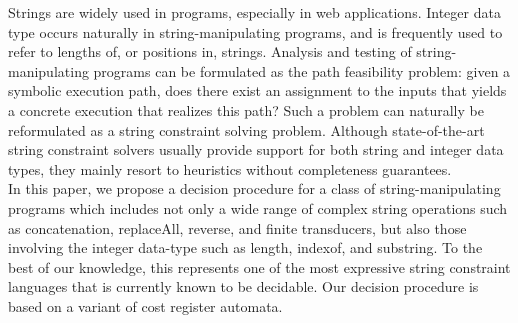 
Strings are widely used in programs, especially in web applications.
Integer data type occurs naturally in string-manipulating programs, and is
frequently used to refer to lengths of, or positions in, strings. 
Analysis and testing of string-manipulating programs can be formulated as the 
path feasibility problem:
given a symbolic execution path, does there exist an assignment to the inputs 
that yields a concrete execution that realizes this path?
Such a problem can naturally be reformulated as a string constraint solving
problem.
Although state-of-the-art string constraint solvers usually provide support for both string and integer data types,   
they mainly resort to heuristics without completeness guarantees. \\ %
%
In this paper, we propose a decision procedure 
for a class of string-manipulating programs
which includes  not only a wide range of complex string operations such as concatenation, replaceAll, reverse, and finite transducers, but also those involving the integer data-type such as length, indexof, and substring. To the best of our knowledge, this represents one of the most expressive string constraint languages that is currently known to be decidable.  Our decision procedure is based on 
a variant of cost register automata. %
